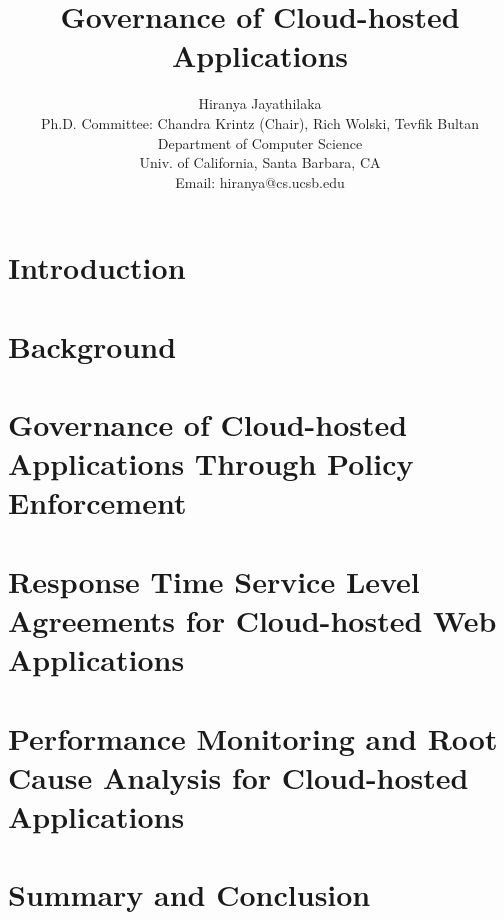 \documentclass[12pt]{article}
\begin{document}
\date{}

\title{Governance of Cloud-hosted Applications}

\author{Hiranya Jayathilaka\\
Ph.D. Committee: Chandra Krintz (Chair), Rich Wolski, Tevfik Bultan\\
Department of Computer Science\\
Univ. of California, Santa Barbara, CA\\
Email: hiranya@cs.ucsb.edu
}
\maketitle

\section{Introduction}


\section{Background}


\section{Governance of Cloud-hosted Applications Through Policy Enforcement}


\section{Response Time Service Level Agreements for Cloud-hosted Web Applications}


\section{Performance Monitoring and Root Cause Analysis for Cloud-hosted Applications}


\section{Summary and Conclusion}




\end{document}
